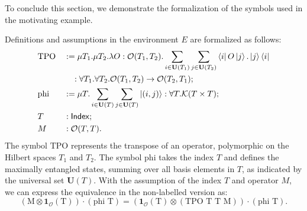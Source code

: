 To conclude this section, we demonstrate the formalization of the symbols used in the motivating example.
\begin{example}
    \label{ex: formalizing motivating}
    Definitions and assumptions in the environment \( E \) are formalized as follows:
    \begin{align*}
        & \text{TPO} && := \mu T_1. \mu T_2. \lambda O : \mathcal{O}(T_1, T_2). \sum_{i \in \mathbf{U}(T_1)} \sum_{j \in \mathbf{U}(T_2)} \bra{i} O \ket{j} . \ket{j}\bra{i} \\
        & &&\quad : \forall T_1. \forall T_2. \mathcal{O}(T_1, T_2) \to \mathcal{O}(T_2, T_1); \\
        &\text{phi} &&:= \mu T. \sum_{i \in \mathbf{U}(T)} \sum_{j \in \mathbf{U}(T)} \ket{(i, j)} : \forall T.\mathcal{K}(T \times T); \\
        & T && : \mathsf{Index}; \\
        & M && : \mathcal{O}(T, T).
    \end{align*}
    The symbol \( \text{TPO} \) represents the transpose of an operator, polymorphic on the Hilbert spaces \( T_1 \) and \( T_2 \). The symbol \( \text{phi} \) takes the index \( T \) and defines the maximally entangled states, summing over all basis elements in \( T \), as indicated by the universal set \( \mathbf{U}(T) \).
    With the assumption of the index \( T \) and operator \( M \), we can express the equivalence in the non-labelled version as:
    \[
    (\textrm{M} \otimes \mathbf{1}_\mathcal{O}(\textrm{T})) \cdot (\textrm{phi T}) = (\mathbf{1}_\mathcal{O}(\textrm{T}) \otimes (\textrm{TPO T T M})) \cdot (\textrm{phi T}).
    \]
\end{example}
